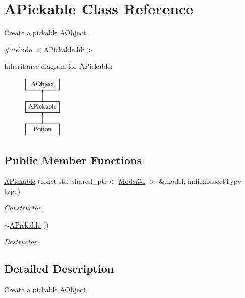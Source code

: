 \hypertarget{classAPickable}{}\section{A\+Pickable Class Reference}
\label{classAPickable}


Create a pickable \hyperlink{classAObject}{A\+Object}.  




{\ttfamily \#include $<$A\+Pickable.\+hh$>$}

Inheritance diagram for A\+Pickable\+:\begin{figure}[H]
\begin{center}
\leavevmode
\includegraphics[height=3.000000cm]{classAPickable}
\end{center}
\end{figure}
\subsection*{Public Member Functions}
\begin{DoxyCompactItemize}
\item 
\hyperlink{classAPickable_a2dbcad766785636f50cd116d057975fc}{A\+Pickable} (const std\+::shared\+\_\+ptr$<$ \hyperlink{classModel3d}{Model3d} $>$ \&model, indie\+::object\+Type type)
\begin{DoxyCompactList}\small\item\em Constructor. \end{DoxyCompactList}\item 
\hyperlink{classAPickable_a145013963070158596ad2e0d07065f5d}{$\sim$\+A\+Pickable} ()
\begin{DoxyCompactList}\small\item\em Destructor. \end{DoxyCompactList}\end{DoxyCompactItemize}


\subsection{Detailed Description}
Create a pickable \hyperlink{classAObject}{A\+Object}. 

